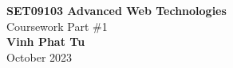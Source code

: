 \begin{titlepage}
    \begin{center}
    {\fontsize{30}{48}\selectfont \bfseries SET09103 Advanced Web Technologies}
    \\\vspace{20pt}
    {\LARGE Coursework Part \#1} \\
    \vspace{20pt}
    \textbf{Vinh Phat Tu }
    \vspace{8pt}
    \\ October 2023
    \end{center}
\end{titlepage}